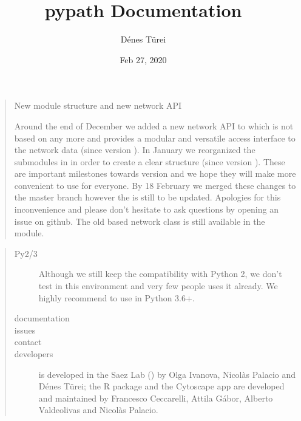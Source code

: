 \documentclass[letterpaper,10pt,english]{sphinxmanual}
\title{pypath Documentation}
\date{Feb 27, 2020}
\author{Dénes Türei}
\begin{document}
\pagestyle{empty}
\sphinxmaketitle
\pagestyle{plain}
\sphinxtableofcontents
\pagestyle{normal}
\label{\detokenize{index::doc}}

\begin{quote}

 New module structure and new network API

Around the end of December we added a new network API to  which
is not based on  any more and provides a modular and versatile
access interface to the network data (since version ). In January
we reorganized the submodules in  in order to create a clear
structure (since version ). These are important milestones
towards version  and we hope they will make  more
convenient to use for everyone. By 18 February we merged these changes
to the master branch however the  is still to be updated.
Apologies for this inconvenience and please don’t hesitate to ask
questions by opening an issue on github. The old  based network
class is still available in the  module.
\end{quote}
\begin{quote}\begin{description}
\item[{Py2/3}] \leavevmode
Although we still keep the compatibility with Python 2, we don’t
test  in this environment and very few people uses it
already. We highly recommend to use  in Python 3.6+.

\item[{documentation}] \leavevmode
{}

\item[{issues}] \leavevmode
{}

\item[{contact}] \leavevmode
{}

\item[{developers}] \leavevmode
{} is developed in the Saez Lab () by
Olga Ivanova, Nicolàs Palacio and Dénes Türei; the R package and the
Cytoscape app are developed and maintained by Francesco Ceccarelli, Attila
Gábor, Alberto Valdeolivas and Nicolàs Palacio.

\end{description}\end{quote}
\end{document}
